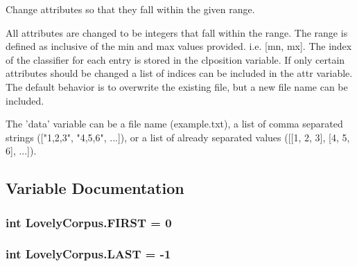 \begin{DoxyVerb}Change attributes so that they fall within the given range.

All attributes are changed to be integers that fall within the range. 
The range is defined as inclusive of the min and max values provided.
i.e. [mn, mx]. The index of the classifier for each entry is stored
in the clposition variable.  If only certain attributes should be 
changed a list of indices can be included in the attr variable. The
default behavior is to overwrite the existing file, but a new file 
name can be included.

The 'data' variable can be a file name (example.txt), a list of comma 
separated strings (["1,2,3", "4,5,6", ...]), or a list of already separated 
values ([[1, 2, 3], [4, 5, 6], ...]).
\end{DoxyVerb}
 

\subsection{Variable Documentation}
\hypertarget{namespaceLovelyCorpus_adfa45fc47e2f21cf331cd82de9fc1b8d}{
\subsubsection[{F\-I\-R\-S\-T}]{\setlength{\rightskip}{0pt plus 5cm}int Lovely\-Corpus.\-F\-I\-R\-S\-T = 0}}\label{namespaceLovelyCorpus_adfa45fc47e2f21cf331cd82de9fc1b8d}
\hypertarget{namespaceLovelyCorpus_a43c85bdcbbbe7b7357e099bd6d3dd033}{
\subsubsection[{L\-A\-S\-T}]{\setlength{\rightskip}{0pt plus 5cm}int Lovely\-Corpus.\-L\-A\-S\-T = -\/1}}\label{namespaceLovelyCorpus_a43c85bdcbbbe7b7357e099bd6d3dd033}
